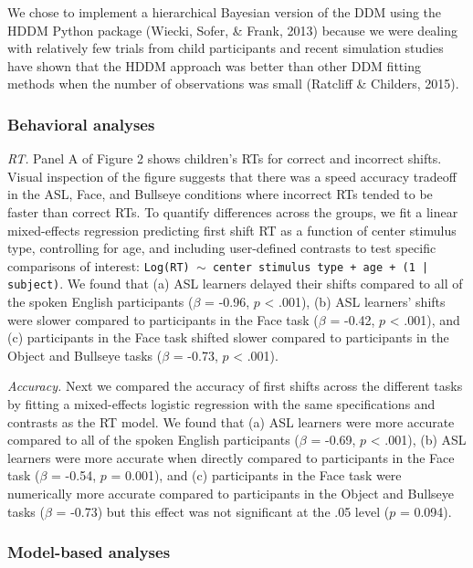 \documentclass[10pt, letterpaper]{article}
\begin{document}
We chose to implement a hierarchical Bayesian version of the DDM using
the HDDM Python package (Wiecki, Sofer, \& Frank, 2013) because we were
dealing with relatively few trials from child participants and recent
simulation studies have shown that the HDDM approach was better than
other DDM fitting methods when the number of observations was small
(Ratcliff \& Childers, 2015).

\subsubsection{Behavioral analyses}\label{behavioral-analyses}

\emph{RT.} Panel A of Figure 2 shows children's RTs for correct and
incorrect shifts. Visual inspection of the figure suggests that there
was a speed accuracy tradeoff in the ASL, Face, and Bullseye conditions
where incorrect RTs tended to be faster than correct RTs. To quantify
differences across the groups, we fit a linear mixed-effects regression
predicting first shift RT as a function of center stimulus type,
controlling for age, and including user-defined contrasts to test
specific comparisons of interest:
\texttt{Log(RT) $\sim$ center stimulus type + age +  (1 | subject)}. We
found that (a) ASL learners delayed their shifts compared to all of the
spoken English participants (\(\beta\) = -0.96, \(p\) \textless{} .001),
(b) ASL learners' shifts were slower compared to participants in the
Face task (\(\beta\) = -0.42, \(p\) \textless{} .001), and (c)
participants in the Face task shifted slower compared to participants in
the Object and Bullseye tasks (\(\beta\) = -0.73, \(p\) \textless{}
.001).

\emph{Accuracy.} Next we compared the accuracy of first shifts across
the different tasks by fitting a mixed-effects logistic regression with
the same specifications and contrasts as the RT model. We found that (a)
ASL learners were more accurate compared to all of the spoken English
participants (\(\beta\) = -0.69, \(p\) \textless{} .001), (b) ASL
learners were more accurate when directly compared to participants in
the Face task (\(\beta\) = -0.54, \(p\) = 0.001), and (c) participants
in the Face task were numerically more accurate compared to participants
in the Object and Bullseye tasks (\(\beta\) = -0.73) but this effect was
not significant at the .05 level (\(p\) = 0.094).

\subsubsection{Model-based analyses}\label{model-based-analyses}
\end{document}
